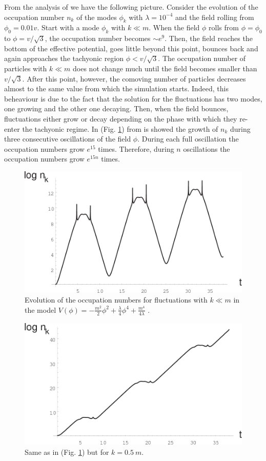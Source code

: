 \documentclass[11pt,a4paper,twoside]{book}
\begin{document}
From the analysis of \cite{Chap5:TachyonicInstability} we have the following picture. Consider the evolution of the occupation number $ n_{k} $ of the modes $ \phi_{k}  $ with $ \lambda = 10^{-4} $ and the field rolling from $ \phi_{0}=0.01v $.
Start with a mode $\phi_{k}$ with $ k\ll m $. When the field $\phi$ rolls from $\phi=\phi_{0}$ to $\phi=v/\sqrt{3}$, the occupation number becomes $ \sim e^{9} $. Then, the field reaches the bottom of the effective potential, goes little beyond this point, bounces back and again approaches the tachyonic region $ \phi < v/\sqrt{3} $. The occupation number of particles with $ k \ll m $ does not change much until the field becomes smaller than $ v/\sqrt{3} $.  After this point, however, the comoving number of particles decreases almost to the same value from which the simulation starts. Indeed, this beheaviour is due to the fact that the solution for the fluctuations has two modes, one growing and the other one decaying. Then, when the field bounces, fluctuations either grow or decay depending on the phase with which they re-enter the tachyonic regime. In (Fig. \ref{fig:tachyonicinstabilityfig1}) from \cite{Chap5:TachyonicInstability} is showed the growth of $ n_{k} $ during three consecutive oscillations of the field $\phi$. During each full oscillation the occupation numbers grow $ e^{15} $ times. Therefore, during $ n $ oscillations the occupation numbers grow $ e^{15n} $ times.
\begin{figure}[h]
	\centering
	\includegraphics[width=0.6\linewidth, height=0.25\textheight]{Images/Chap5/TachyonicInstability_Fig1}
	\caption{Evolution of the occupation numbers for fluctuations with $ k\ll m $ in the model $ V(\phi)=-\frac{m^{2}}{2}\phi^{2} + \frac{\lambda}{4}\phi^{4} + \frac{m^{4}}{4\lambda} $ \cite{Chap5:TachyonicInstability}.}
	\label{fig:tachyonicinstabilityfig1}
\end{figure}
\begin{figure}[h]
	\centering
	\includegraphics[width=0.6\linewidth, height=0.25\textheight]{Images/Chap5/TachyonicInstability_Fig2}
	\caption{Same as in (Fig. \ref{fig:tachyonicinstabilityfig1}) but for $ k=0.5\ m $\cite{Chap5:TachyonicInstability}.}
	\label{fig:tachyonicinstabilityfig2}
\end{figure}
\end{document}
